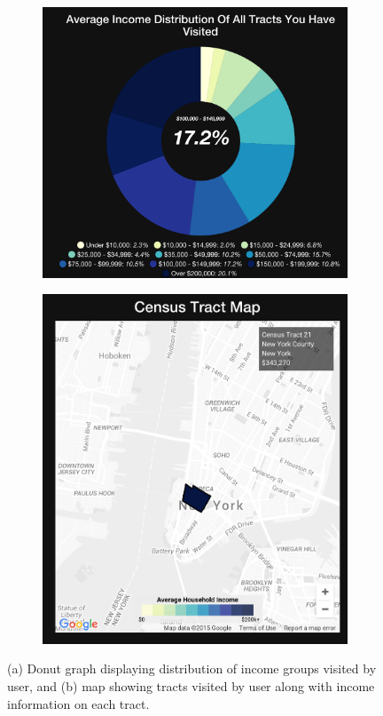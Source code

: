 \begin{figure}
  \centering
  \begin{subfigure}[b]{.2\textwidth}
    \centering
    \includegraphics[width=\linewidth]{fig/findyou/donut.png}
    \caption{}
  \end{subfigure}
  \begin{subfigure}[b]{.2\textwidth}
    \centering
    \includegraphics[width=\linewidth]{fig/findyou/tract-map.png}
    \caption{}
  \end{subfigure}
  \caption{(a) Donut graph displaying distribution of income groups visited by user, and (b) map showing tracts visited by user along with income information on each tract.}
\end{figure}


